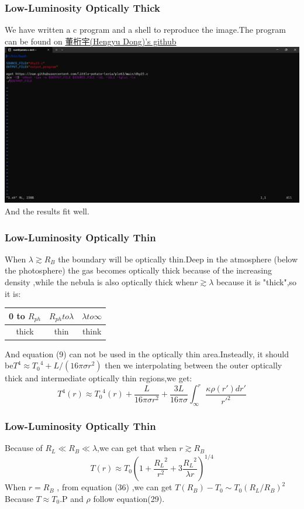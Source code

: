 \documentclass{beamer}
\begin{document}
\begin{frame}
\frametitle{Low-Luminosity Optically Thick}
We have written a c program and a shell to reproduce the image.The program can be found on \href{https://github.com/little-potato-loria/plot2.git}{董桁宇(Hengyu Dong)'s github}
 \href{run:sm.mp4}{\includegraphics[width=\linewidth]{sm_frame.png}}
 And the results fit well.
\end{frame}

\begin{frame}
\frametitle{Low-Luminosity Optically Thin}
When $\lambda \gtrsim R_B$ the boundary will be optically thin.Deep in the atmosphere (below the photosphere) the gas becomes optically thick because of the increasing density ,while the nebula is also optically thick when$r\gtrsim \lambda$ because it is "thick",so it is:
\begin{table}
\centering
\begin{tabular}{|c|c|c|}
\hline
0 to $R_{ph}$ & $R_{ph} to \lambda$ & $\lambda to \infty$\\
\hline
thick & thin & think \\
\hline
\end{tabular}
\end{table}
And equation (9) can not be used in the optically thin area.Insteadly, it should be$ T^4\approx {T_0}^4 +L/(16 \pi \sigma r^2)$ then we interpolating between the outer optically thick and intermediate optically thin regions,we get:
\begin{equation}
T^4 (r) \approx {T_0}^4 (r)+\frac{L}{16 \pi \sigma r^2}+\frac{3L}{16 \pi \sigma}\int_{\infty}^{r}\frac{\kappa \rho(r')dr'}{{r'}^2}
\end{equation}
\end{frame}

\begin{frame}
\frametitle{Low-Luminosity Optically Thin}
Because of $R_L \ll R_B \ll \lambda$,we can get that when $r \gtrsim R_B$
\begin{equation}
T (r) \approx T_0{(1+\frac{{R_L}^2}{r^2}+3\frac{{R_L}^2}{\lambda r})}^{1/4}
\end{equation}
When $r =R_B$ , from equation (36) ,we can get $T(R_B)-T_0 \sim T_0(R_L /R_B)^2$\\
Because $T\approx T_0$.P and $\rho$ follow equation(29).
\end{frame}
\end{document}
